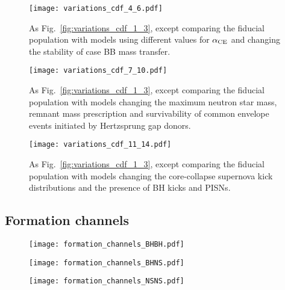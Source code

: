\begin{figure*}[p]
    \centering
    \texttt{[image: variations\_cdf\_4\_6.pdf]}
    \caption{As Fig.~\ref{fig:variations_cdf_1_3}, except comparing the fiducial population with models using different values for $\alpha_{\rm CE}$ and changing the stability of case BB mass transfer.}
    \label{fig:variations_cdf_4_6}
\end{figure*}

\begin{figure*}[p]
    \centering
    \texttt{[image: variations\_cdf\_7\_10.pdf]}
    \caption{As Fig.~\ref{fig:variations_cdf_1_3}, except comparing the fiducial population with models changing the maximum neutron star mass, remnant mass prescription and survivability of common envelope events initiated by Hertzsprung gap donors.}
    \label{fig:variations_cdf_7_10}
\end{figure*}

\begin{figure*}[p]
    \centering
    \texttt{[image: variations\_cdf\_11\_14.pdf]}
    \caption{As Fig.~\ref{fig:variations_cdf_1_3}, except comparing the fiducial population with models changing the core-collapse supernova kick distributions and the presence of BH kicks and PISNs.}
    \label{fig:variations_cdf_11_14}
\end{figure*}

\subsection{Formation channels}

\begin{figure}
    \centering
    \texttt{[image: formation\_channels\_BHBH.pdf]}
\end{figure}

\begin{figure}
    \centering
    \texttt{[image: formation\_channels\_BHNS.pdf]}
\end{figure}

\begin{figure}
    \centering
    \texttt{[image: formation\_channels\_NSNS.pdf]}
\end{figure}